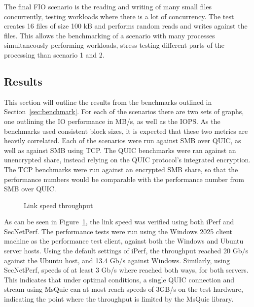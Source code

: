 \documentclass[english, 12pt, a4paper, elec, utf8, a-2b, online]{aaltothesis}
\begin{document}
The final FIO scenario is the reading and writing of many small files concurrently,
testing workloads where there is a lot of concurrency. The test creates 16 files
of size 100 kB and performs random reads and writes against the files. This allows the benchmarking
of a scenario with many processes simultaneously performing workloads, stress
testing different parts of the processing than scenario 1 and 2.

\subsection{Results}

This section will outline the results from the benchmarks outlined in Section~\ref{sec:benchmark}.
For each of the scenarios there are two sets of graphs, one outlining the IO performance
in MB/s, as well as the IOPS. As the benchmarks used consistent block sizes, it is
expected that these two metrics are heavily correlated. Each of the scenarios were
run against SMB over QUIC,
as well as against SMB using TCP. The QUIC benchmarks were ran against an unencrypted
share, instead relying on the QUIC protocol's integrated encryption. The TCP benchmarks
were run against an encrypted SMB share, so that the performance numbers would be
comparable with the performance number from SMB over QUIC.
\begin{figure}[h]
\centering
{}
\caption{Link speed throughput}
\label{fig:perf_graph}
\end{figure}

As can be seen in Figure~\ref{fig:perf_graph}, the link speed was verified using both
iPerf and SecNetPerf. The performance tests were run using the Windows 2025 client
machine as the performance test client, against both the Windows and Ubuntu
server hosts. Using the default settings of iPerf, the throughput reached 20 Gb/s
against the Ubuntu host, and 13.4 Gb/s against Windows. Similarly, using SecNetPerf,
speeds of at least 3 Gb/s where reached both ways, for both servers. This indicates
that under optimal conditions, a single QUIC connection and stream using MsQuic can at most reach
speeds of 3GB/s on the test hardware, indicating the point where the throughput is limited by the MsQuic
library.
\end{document}
